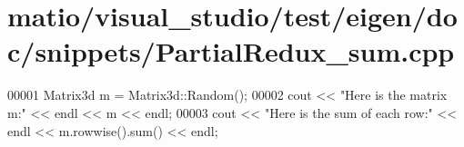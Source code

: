 \hypertarget{matio_2visual__studio_2test_2eigen_2doc_2snippets_2_partial_redux__sum_8cpp_source}{}\section{matio/visual\+\_\+studio/test/eigen/doc/snippets/\+Partial\+Redux\+\_\+sum.cpp}
\label{matio_2visual__studio_2test_2eigen_2doc_2snippets_2_partial_redux__sum_8cpp_source}

\begin{DoxyCode}
00001 Matrix3d m = Matrix3d::Random();
00002 cout << \textcolor{stringliteral}{"Here is the matrix m:"} << endl << m << endl;
00003 cout << \textcolor{stringliteral}{"Here is the sum of each row:"} << endl << m.rowwise().sum() << endl;
\end{DoxyCode}
